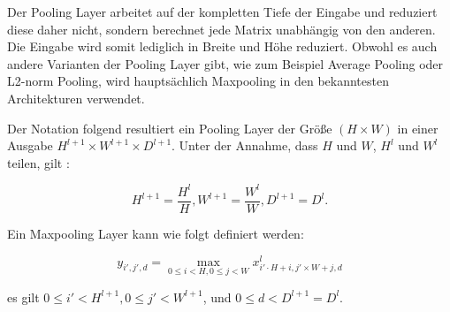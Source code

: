 Der Pooling Layer arbeitet auf der kompletten Tiefe der Eingabe und reduziert diese daher nicht, sondern berechnet jede Matrix unabhängig von den anderen. Die Eingabe wird somit lediglich in Breite und Höhe reduziert. Obwohl es auch andere Varianten der Pooling Layer gibt, wie zum Beispiel Average Pooling oder L2-norm Pooling, wird hauptsächlich Maxpooling in den bekanntesten Architekturen verwendet.

Der Notation folgend resultiert ein Pooling Layer der Größe $(H \times W)$ in einer Ausgabe $H^{l+1} \times W^{l+1} \times D^{l+1}$. Unter der Annahme, dass $H$ und $W$, $H^l$ und $W^l$ teilen, gilt \parencite{Wu.2017}:

\begin{equation}
H^{l+1} = \frac{H^l}{H}, W^{l+1} = \frac{W^l}{W}, D^{l+1} = D^l.
\end{equation} 

Ein Maxpooling Layer kann wie folgt definiert werden:

\begin{equation}
y_{i', j', d} = \max_{0 \leq i<H, 0 \leq j <W} x^{l}_{i' \cdot H + i, j' \times W + j, d}
\end{equation}

es gilt $0 \leq i' < H^{l+1}, 0 \leq j' < W^{l+1}$, und $0 \leq d < D^{l+1} = D^l$.  